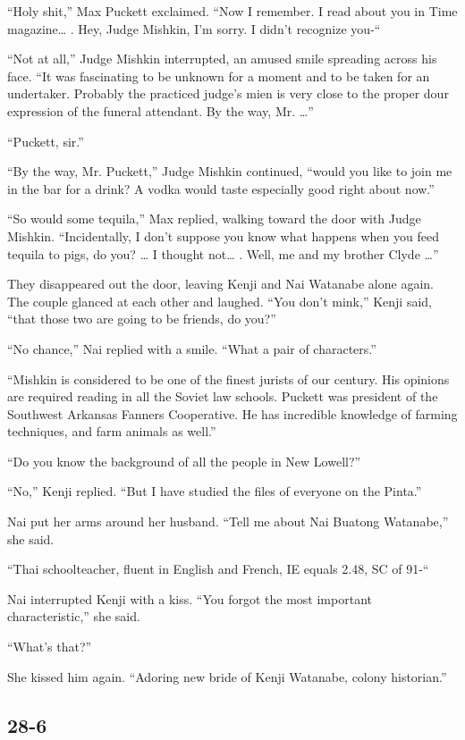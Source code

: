 \documentclass[]{article}
\begin{document}
{“Holy shit,” Max Puckett exclaimed.  “Now I remember.  I read about you in Time magazine… .  Hey, Judge Mishkin, I’m sorry.  I didn’t recognize you-“

“Not at all,” Judge Mishkin interrupted, an amused smile spreading across his face.  “It was fascinating to be unknown for a moment and to be taken for an undertaker.  Probably the practiced judge’s mien is very close to the proper dour expression of the funeral attendant.  By the way, Mr.  …”

“Puckett, sir.”

“By the way, Mr.  Puckett,” Judge Mishkin continued, “would you like to join me in the bar for a drink? A vodka would taste especially good right about now.”

“So would some tequila,” Max replied, walking toward the door with Judge Mishkin.  “Incidentally, I don’t suppose you know what happens when you feed tequila to pigs, do you? … I thought not… .  Well, me and my brother Clyde …”

They disappeared out the door, leaving Kenji and Nai Watanabe alone again.  The couple glanced at each other and laughed.  “You don’t mink,” Kenji said, “that those two are going to be friends, do you?”

“No chance,” Nai replied with a smile.  “What a pair of characters.”

“Mishkin is considered to be one of the finest jurists of our century.  His opinions are required reading in all the Soviet law schools.  Puckett was president of the Southwest Arkansas Fanners Cooperative.  He has incredible knowledge of farming techniques, and farm animals as well.”

“Do you know the background of all the people in New Lowell?”

“No,” Kenji replied.  “But I have studied the files of everyone on the Pinta.”

Nai put her arms around her husband.  “Tell me about Nai Buatong Watanabe,” she said.

“Thai schoolteacher, fluent in English and French, IE equals 2.48, SC of 91-“

Nai interrupted Kenji with a kiss.  “You forgot the most important characteristic,” she said.

“What’s that?”

She kissed him again.  “Adoring new bride of Kenji Watanabe, colony historian.”


\subsection*{28-6}

}
\end{document}
